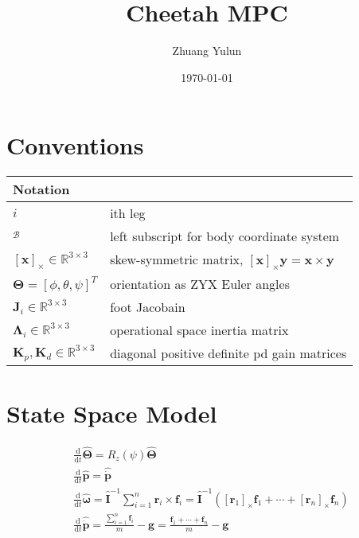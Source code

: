 \documentclass{article}
\title{Cheetah MPC}
\author{Zhuang Yulun}
\date{\today}
\begin{document}
\maketitle

\section{Conventions}


\begin{tabular}{l l}
    \hline
    Notation & \\
    \hline
    $ i$ & ith leg\\
    $_\mathcal B$ &left subscript for body coordinate system\\
    $[\mathbf x]_\times \in \mathbb R^{3\times 3}$ & skew-symmetric matrix, $[\mathbf x]_\times \mathbf y = \mathbf x \times \mathbf y$\\
    $\mathbf \Theta = [\phi, \theta, \psi]^T$ & orientation as ZYX Euler angles\\
    $\mathbf J_i\in \mathbb R^{3\times 3}$ & foot Jacobain\\
    $\mathbf\Lambda_i\in \mathbb R^{3\times 3}$ &operational space inertia matrix\\
    $\mathbf K_p, \mathbf K_d\in \mathbb R^{3\times 3}$ &diagonal positive definite pd gain matrices\\
    \hline

\end{tabular}

\section{State Space Model}

\begin{align}
    &\frac{\mathrm d}{\mathrm d t} \hat{\mathbf\Theta}=R_{z}(\psi) \hat{\mathbf\Theta} \\
    &\frac{\mathrm d}{\mathrm d t} \hat{\mathbf p}=\hat{\dot{\mathbf p}} \\
    &\frac{\mathrm d}{\mathrm d t} \hat{\mathbf \omega}=\hat{\mathbf I}^{-1} \sum_{i=1}^{n} \mathbf r_{i} \times \mathbf f_{i}=\hat{\mathbf I}^{-1}\left(\left[\mathbf r_{1}\right]_{\times} \mathbf f_{1}+\cdots+\left[\mathbf r_{n}\right]_{\times} \mathbf f_{n}\right) \\
    &\frac{\mathrm d}{\mathrm d t} \hat{\dot{\mathbf p}}=\frac{\sum_{i=1}^{n} \mathbf f_{i}}{m}-\mathbf g=\frac{\mathbf f_{1}+\cdots+\mathbf f_{n}}{m}-\mathbf g
\end{align}
\end{document}
